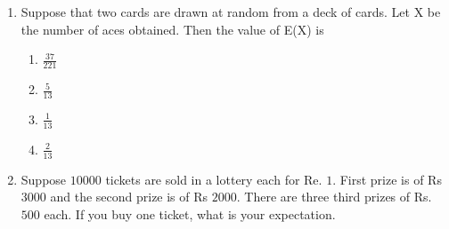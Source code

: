 \begin{enumerate}[label=\thechapter.\arabic*,ref=\thechapter.\theenumi]
\begin{enumerate}
\end{enumerate}

\item Suppose that two cards are drawn at random from a deck of cards. Let X be the
number of aces obtained. Then the value of E(X) is
\begin{enumerate}

\item $\frac{37}{221}$
\item $\frac{5}{13}$
\item $\frac{1}{13}$
\item $\frac{2}{13}$

\end{enumerate}

\item Suppose $10000$ tickets are sold in a lottery each for Re. $1$. First prize is of Rs $3000$ and the second prize is of Rs $2000$. There are three third prizes of Rs. $500$ each. If you buy one ticket, what is your expectation.

\end{enumerate}
